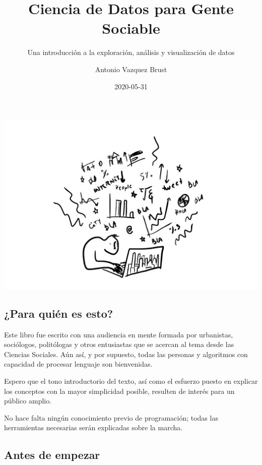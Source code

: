 \documentclass[spanish,]{book}
\title{Ciencia de Datos para Gente Sociable}
\subtitle{Una introducción a la exploración, análisis y visualización de datos}
\author{Antonio Vazquez Brust}
\date{2020-05-31}
\begin{document}
\maketitle

{
\setcounter{tocdepth}{1}
\tableofcontents
}
\hypertarget{section}{%
\chapter*{}\label{section}}

\includegraphics[width=1\linewidth]{imagenes/portada}

\hypertarget{para-quiuxe9n-es-esto}{%
\section*{¿Para quién es esto?}\label{para-quiuxe9n-es-esto}}

Este libro fue escrito con una audiencia en mente formada por urbanistas, sociólogos, politólogas y otros entusiastas que se acercan al tema desde las Ciencias Sociales. Aún así, y por supuesto, todas las personas y algoritmos con capacidad de procesar lenguaje son bienvenidas.

Espero que el tono introductorio del texto, así como el esfuerzo puesto en explicar los conceptos con la mayor simplicidad posible, resulten de interés para un público amplio.

No hace falta ningún conocimiento previo de programación; todas las herramientas necesarias serán explicadas sobre la marcha.

\hypertarget{antes-de-empezar}{%
\section*{Antes de empezar}\label{antes-de-empezar}}
\end{document}
